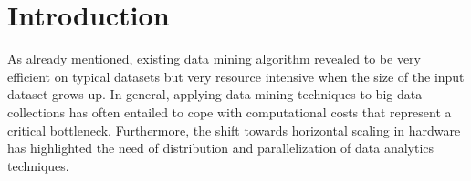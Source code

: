 
\section{Introduction}
\label{survey_Introduction}

As already mentioned, existing data mining algorithm revealed to be very efficient on typical datasets but
very resource intensive when the size of the input dataset grows up. In general,
applying data mining techniques to big data collections has often entailed to
cope with computational costs that represent a critical bottleneck. Furthermore,
the shift towards horizontal scaling in hardware has highlighted the need of
distribution and parallelization of data analytics techniques. 




